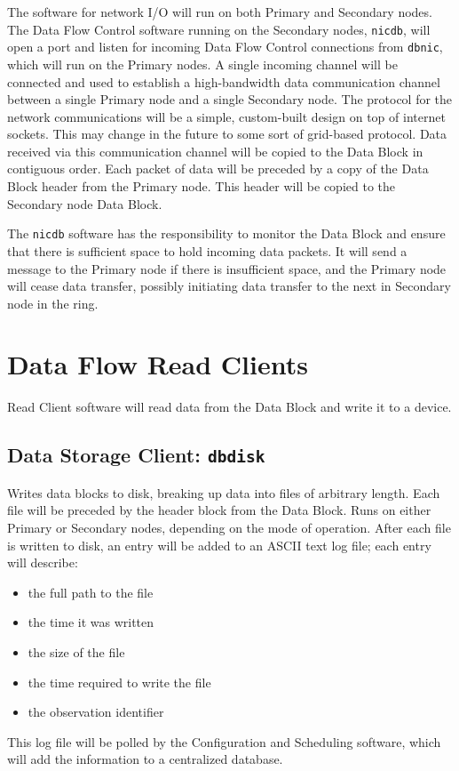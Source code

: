 The software for network I/O will run on both Primary and Secondary
nodes.  The Data Flow Control software running on the Secondary nodes,
{\tt nicdb}, will open a port and listen for incoming Data Flow
Control connections from {\tt dbnic}, which will run on the Primary
nodes.  A single incoming channel will be connected and used to
establish a high-bandwidth data communication channel between a single
Primary node and a single Secondary node.  The protocol for the
network communications will be a simple, custom-built design on top of
internet sockets.  This may change in the future to some sort of
grid-based protocol.  Data received via this communication channel
will be copied to the Data Block in contiguous order.  Each packet of
data will be preceded by a copy of the Data Block header from the
Primary node.  This header will be copied to the Secondary node Data
Block.

The {\tt nicdb} software has the responsibility to monitor the Data
Block and ensure that there is sufficient space to hold incoming data
packets.  It will send a message to the Primary node if there is
insufficient space, and the Primary node will cease data transfer,
possibly initiating data transfer to the next in Secondary node in the
ring.

\section{Data Flow Read Clients}

Read Client software will read data from the Data Block and write it
to a device.

\subsection{Data Storage Client: {\tt dbdisk}}

Writes data blocks to disk, breaking up data into files of arbitrary
length.  Each file will be preceded by the header block from the Data
Block.  Runs on either Primary or Secondary nodes, depending on the
mode of operation.  After each file is written to disk, an entry will
be added to an ASCII text log file; each entry will describe:
\begin{itemize}
\item the full path to the file
\item the time it was written
\item the size of the file
\item the time required to write the file
\item the observation identifier
\end{itemize}
This log file will be polled by the Configuration and Scheduling
software, which will add the information to a centralized database.

